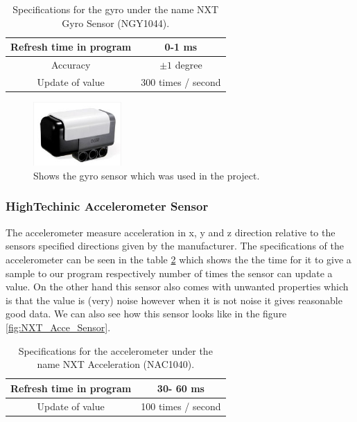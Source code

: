 \documentclass[a4paper]{article}
\begin{document}
        
        \begin{table}[h]
		\center
		\begin{tabular}{|c |c|}
			\hline
			 Refresh time in program & 0-1 ms   \\ 
			\hline
			Accuracy &  $\pm 1$ degree  \\ 
			\hline
			Update of value & 300 times / second \\
	        		\hline
		\end{tabular}
		\caption{Specifications for the gyro under the name NXT Gyro Sensor (NGY1044).}
		\label{table:Gyro_sensor}
	\end{table}


	\begin{figure}[h]
		\centering
		\includegraphics[width=0.3\textwidth]{NXT_Gyro_Sensor}
		\caption{Shows the gyro sensor which was used in the project.}
		\label{fig:NXT_Gyro_Sensor}
	\end{figure}
        
        
        \subsubsection{HighTechinic Accelerometer Sensor}
        
The accelerometer measure acceleration in x, y and z direction relative to the sensors specified directions given by the manufacturer. The specifications of the accelerometer can be seen in the table \ref{table:Acce_sensor} which shows the the time for it to give a sample to our program respectively number of times the sensor can update a value. On the other hand this sensor also comes with unwanted properties which is that the value is (very) noise however when it is not noise it gives reasonable good data. We can also see how this sensor looks like in the figure \ref{fig:NXT_Acce_Sensor}.
         \begin{table}[h]
		\center
		\begin{tabular}{|c |c|}
			\hline
			 Refresh time in program & 30- 60 ms   \\ 
			\hline
			Update of value &  100 times / second  \\ 
			\hline
		\end{tabular}
		\caption{Specifications for the accelerometer under the name NXT Acceleration (NAC1040).}
		\label{table:Acce_sensor}
	\end{table}
	
\end{document}
